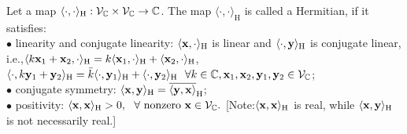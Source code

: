\begin{definition}
Let a map $\langle \cdot, \cdot \rangle_\text{H}: \mathcal{V}_{\mathbb{C}} \times \mathcal{V}_{\mathbb{C}} \to \mathbb{C}$. The map $\langle \cdot, \cdot \rangle_\text{H}$ is called a Hermitian, if it satisfies:\\ 
$\bullet$ linearity and conjugate linearity: $\langle \mathbf{x}, \cdot \rangle_\text{H} $ is linear and $\langle \cdot, \mathbf{y} \rangle_\text{H} $ is conjugate linear, i.e.,$\langle k\mathbf{x}_1+\mathbf{x}_2, \cdot  \rangle_\text{H} = k \langle \mathbf{x}_1, \cdot \rangle_\text{H} + \langle  \mathbf{x}_2, \cdot \rangle_\text{H}$,  $\langle \cdot, k\mathbf{y}_1+\mathbf{y}_2 \rangle_\text{H} = \bar{k} \langle \cdot, \mathbf{y}_1 \rangle_\text{H} + \langle \cdot, \mathbf{y}_2 \rangle_\text{H} ~\ \forall k \in \mathbb{C}, \mathbf{x}_1, \mathbf{x}_2, \mathbf{y}_1, \mathbf{y}_2 \in \mathcal{V}_{\mathbb{C}}$; \\
$\bullet$ conjugate symmetry: $\langle \mathbf{x}, \mathbf{y} \rangle_\text{H} = \overline{\langle \mathbf{y},\mathbf{x} \rangle}_\text{H} $;\\
$\bullet$ positivity: $ \langle \mathbf{x}, \mathbf{x} \rangle_\text{H} > 0, ~\ \forall \textnormal{ nonzero } \mathbf{x} \in \mathcal{V}_{\mathbb{C}}.$ [Note:$\langle \mathbf{x}, \mathbf{x} \rangle_\text{H}$ is real, while $\langle \mathbf{x}, \mathbf{y} \rangle_\text{H}$ is not necessarily real.]\\
\end{definition}


